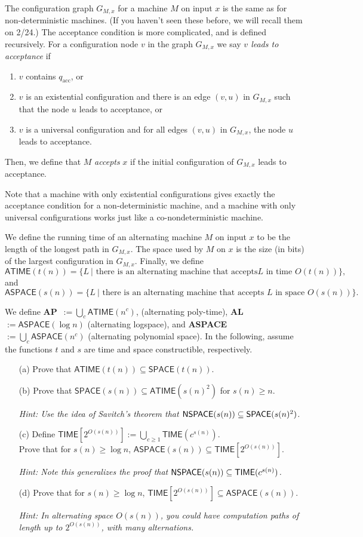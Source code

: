 \documentclass{article}
\newcommand{\TIME}{\mathbf{TIME}}
\def \ATIME{{\mathsf{ATIME}}}
\def \ASPACE{{\mathsf{ASPACE}}}
\def \SPACE{{\mathsf{SPACE}}}
\def \TIME{{\mathsf{TIME}}}
\begin{document}
The configuration graph $G_{M,x}$ for a machine $M$ on input $x$ is the same as for non-deterministic machines. (If you haven't seen these before, we will recall them on 2/24.) The acceptance condition is more complicated, and is defined recursively. For a configuration node $v$ in the graph $G_{M,x}$ we say {\em $v$ leads to acceptance} if \begin{enumerate}
\item $v$ contains $q_{\text{acc}}$, or 
\item $v$ is an existential configuration and there is an edge $(v,u)$ in $G_{M,x}$ such that the node $u$ leads to acceptance, or 
\item $v$ is a universal configuration and for all edges $(v,u)$ in $G_{M,x}$, the node $u$ leads to acceptance. 
\end{enumerate}
Then, we define that $M$ \emph{accepts} $x$ if the initial
configuration of $G_{M,x}$ leads to acceptance. 

Note that a machine with only existential configurations gives exactly the acceptance condition for a non-deterministic machine, and a machine with only universal configurations works just like a co-nondeterministic machine.

We define the running time of an alternating machine $M$ on input $x$ to be the length of the longest path in $G_{M,x}$. The space used by $M$ on $x$ is the size (in bits) of the largest configuration in $G_{M,x}$. Finally, we define\[\ATIME(t(n)) = \{L ~| \text{ there is an alternating machine that accepts
$L$ in time $O(t(n))$}\},\] and
\[\ASPACE(s(n)) = \{L ~| \text{ there is an alternating machine that
accepts $L$ in space $O(s(n))$}\}.\]

We define {\bf AP}~$:= \bigcup_c \ATIME(n^c)$, (alternating poly-time), {\bf AL}~$:= \ASPACE(\log n)$ (alternating logspace), and {\bf ASPACE}~$:= \bigcup_c \ASPACE(n^c)$ (alternating polynomial
space). In the following, assume the functions $t$ and $s$ are time and space constructible, respectively.

\begin{enumerate}
\item[(a)] Prove that $\ATIME(t(n)) \subseteq \SPACE(t(n))$.
\item[(b)] Prove that $\SPACE(s(n)) \subseteq \ATIME(s(n)^2)$ for
$s(n)\geq n$.

{\it Hint: Use the idea of Savitch's theorem that ${\sf NSPACE}(s(n)) \subseteq \SPACE(s(n)^2)$.}

\item[(c)] Define $\TIME[2^{O(s(n))}] := {\bigcup_{c \geq 1} \TIME(c^{s(n)})}$.\\
Prove that  for $s(n) \geq \log n$, $\ASPACE(s(n)) \subseteq \TIME[2^{O(s(n))}]$.

{\it Hint: Note this generalizes the proof that ${\sf NSPACE}(s(n))
	\subseteq \TIME(c^{s(n)})$.}

\item[(d)] Prove that for $s(n) \geq \log n$, $\TIME[2^{O(s(n))}] \subseteq \ASPACE(s(n))$.

{\it Hint: In alternating space $O(s(n))$, you could have computation paths of length up to $2^{O(s(n))}$, with many alternations.} 
\end{enumerate}
\end{document}
